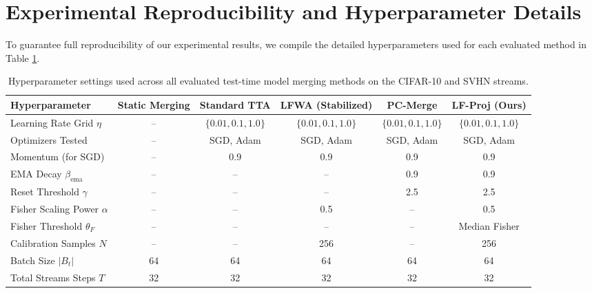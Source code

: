 \documentclass{article}
\theoremstyle{plain}
\theoremstyle{definition}
\theoremstyle{remark}
\begin{document}
\section{Experimental Reproducibility and Hyperparameter Details}
To guarantee full reproducibility of our experimental results, we compile the detailed hyperparameters used for each evaluated method in Table \ref{tab:hyperparams}.

\begin{table}[h]
\caption{Hyperparameter settings used across all evaluated test-time model merging methods on the CIFAR-10 and SVHN streams.}
\label{tab:hyperparams}
\vskip 0.15in
\begin{center}
\begin{small}
\begin{sc}
\begin{tabular}{lccccc}
\toprule
Hyperparameter & Static Merging & Standard TTA & LFWA (Stabilized) & PC-Merge & \textbf{LF-Proj (Ours)} \\
\midrule
Learning Rate Grid $\eta$ & -- & $\{0.01, 0.1, 1.0\}$ & $\{0.01, 0.1, 1.0\}$ & $\{0.01, 0.1, 1.0\}$ & $\{0.01, 0.1, 1.0\}$ \\
Optimizers Tested & -- & SGD, Adam & SGD, Adam & SGD, Adam & SGD, Adam \\
Momentum (for SGD) & -- & 0.9 & 0.9 & 0.9 & 0.9 \\
EMA Decay $\beta_{\text{ema}}$ & -- & -- & -- & 0.9 & 0.9 \\
Reset Threshold $\gamma$ & -- & -- & -- & 2.5 & 2.5 \\
Fisher Scaling Power $\alpha$ & -- & -- & 0.5 & -- & 0.5 \\
Fisher Threshold $\theta_F$ & -- & -- & -- & -- & Median Fisher \\
Calibration Samples $N$ & -- & -- & 256 & -- & 256 \\
Batch Size $|B_t|$ & 64 & 64 & 64 & 64 & 64 \\
Total Streams Steps $T$ & 32 & 32 & 32 & 32 & 32 \\
\bottomrule
\end{tabular}
\end{sc}
\end{small}
\end{center}
\vskip -0.1in
\end{table}
\end{document}
